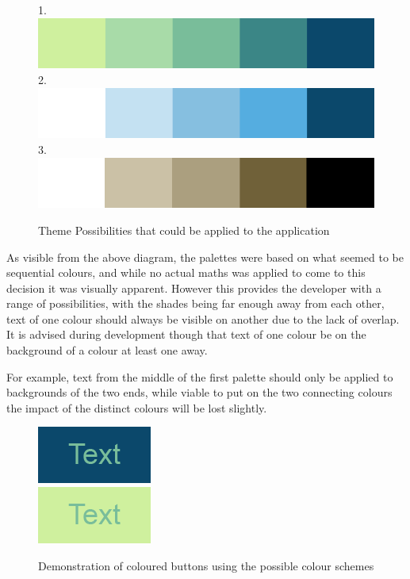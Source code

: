 \begin{figure}[h]
1.
\includegraphics[scale=0.5]{Chapter2/colourone.png} \\

2.
\includegraphics[scale=0.5]{Chapter2/colourtwo.png} \\

3.
\includegraphics[scale=0.5]{Chapter2/colourthree.png}
\caption[Theme Possibilities]{Theme Possibilities that could be applied to the application}
\end{figure}
As visible from the above diagram, the palettes were based on what seemed to be sequential colours, and while no actual maths was applied to come to this decision it was visually apparent. However this provides the developer with a range of possibilities, with the shades being far enough away from each other, text of one colour should always be visible on another due to the lack of overlap. It is advised during development though that text of one colour be on the background of a colour at least one away. 

For example, text from the middle of the first palette should only be applied to backgrounds of the two ends, while viable to put on the two connecting colours the impact of the distinct colours will be lost slightly. 
\begin{figure}
\includegraphics[scale=0.5]{Chapter2/textone.png} \\

\vspace{0.2cm}
\includegraphics[scale=0.5]{Chapter2/texttwo.png} 
\caption[Button Examples]{Demonstration of coloured buttons using the possible colour schemes}
\end{figure}


